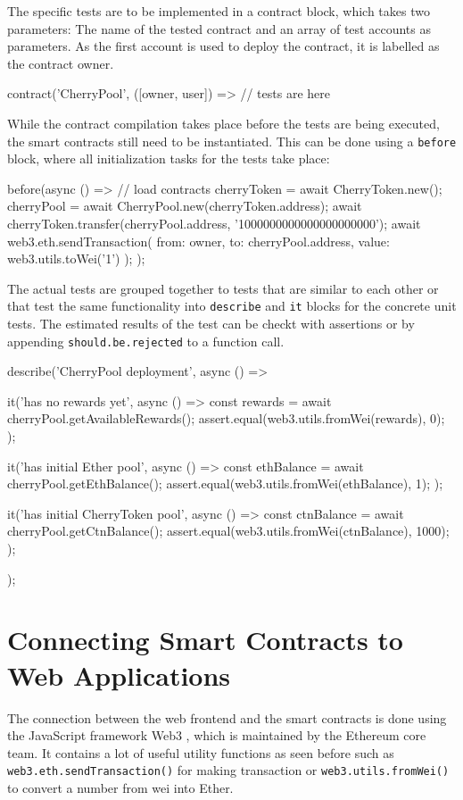 The specific tests are to be implemented in a contract block, which takes two parameters: The name of the tested contract and an array of test accounts as parameters. As the first account is used to deploy the contract, it is labelled as the contract owner.

\begin{JsCode}
contract('CherryPool', ([owner, user]) => {
	// tests are here
}	
\end{JsCode}

While the contract compilation takes place before the tests are being executed, the smart contracts still need to be instantiated. This can be done using a \texttt{before} block, where all initialization tasks for the tests take place:

\begin{JsCode}
before(async () => {
  // load contracts
  cherryToken = await CherryToken.new();
  cherryPool = await CherryPool.new(cherryToken.address);
  await cherryToken.transfer(cherryPool.address, '1000000000000000000000');
  await web3.eth.sendTransaction({ from: owner, to: cherryPool.address, value: web3.utils.toWei('1') });
});	
\end{JsCode}

The actual tests are grouped together to tests that are similar to each other or that test the same functionality into \texttt{describe} and \texttt{it} blocks for the concrete unit tests. The estimated results of the test can be checkt with assertions or by appending \texttt{should.be.rejected} to a function call.

\begin{JsCode}
describe('CherryPool deployment', async () => {
  it('has no rewards yet', async () => {
    const rewards = await cherryPool.getAvailableRewards();
    assert.equal(web3.utils.fromWei(rewards), 0);
  });

  it('has initial Ether pool', async () => {
    const ethBalance = await cherryPool.getEthBalance();
    assert.equal(web3.utils.fromWei(ethBalance), 1);
  });

  it('has initial CherryToken pool', async () => {
    const ctnBalance = await cherryPool.getCtnBalance();
    assert.equal(web3.utils.fromWei(ctnBalance), 1000);
  });
});
\end{JsCode}

\section{Connecting Smart Contracts to Web Applications}
The connection between the web frontend and the smart contracts is done using the JavaScript framework Web3 \cite{Web3}, which is maintained by the Ethereum core team. It contains a lot of useful utility functions as seen before such as \texttt{web3.eth.sendTransaction()} for making transaction or \texttt{web3.utils.fromWei()} to convert a number from wei into Ether.

